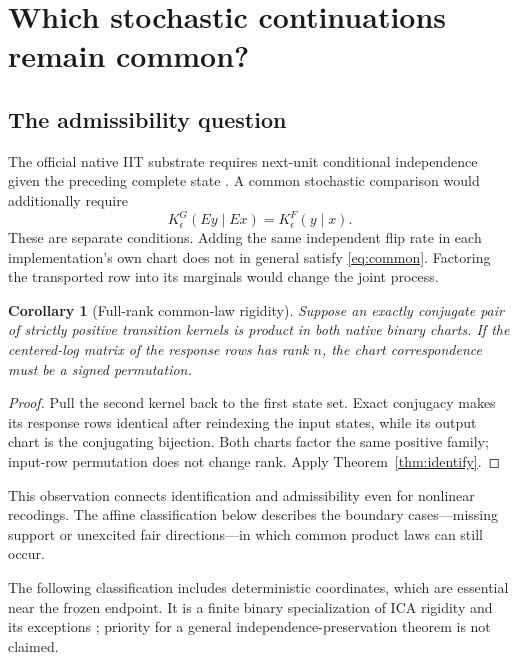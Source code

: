 \documentclass[11pt]{article}
\newtheorem{corollary}[theorem]{Corollary}
\theoremstyle{definition}\newtheorem{definition}[theorem]{Definition}
\theoremstyle{remark}\newtheorem{remark}[theorem]{Remark}
\begin{document}
\section{Which stochastic continuations remain common?}
\subsection{The admissibility question}
The official native IIT substrate requires next-unit conditional independence given the preceding complete state \cite{pyphi,conditional}. A common stochastic comparison would additionally require
\begin{equation}
K^G_\epsilon(Ey\mid Ex)=K^F_\epsilon(y\mid x).\label{eq:common}
\end{equation}
These are separate conditions. Adding the same independent flip rate in each implementation's own chart does not in general satisfy \eqref{eq:common}. Factoring the transported row into its marginals would change the joint process.

\begin{corollary}[Full-rank common-law rigidity]\label{cor:commonrank}
Suppose an exactly conjugate pair of strictly positive transition kernels is product in both native binary charts. If the centered-log matrix of the response rows has rank $n$, the chart correspondence must be a signed permutation.
\end{corollary}
\begin{proof}
Pull the second kernel back to the first state set. Exact conjugacy makes its response rows identical after reindexing the input states, while its output chart is the conjugating bijection. Both charts factor the same positive family; input-row permutation does not change rank. Apply Theorem~\ref{thm:identify}.
\end{proof}
This observation connects identification and admissibility even for nonlinear recodings. The affine classification below describes the boundary cases---missing support or unexcited fair directions---in which common product laws can still occur.

The following classification includes deterministic coordinates, which are essential near the frozen endpoint. It is a finite binary specialization of ICA rigidity and its exceptions \cite{yeredor}; priority for a general independence-preservation theorem is not claimed.
\end{document}
